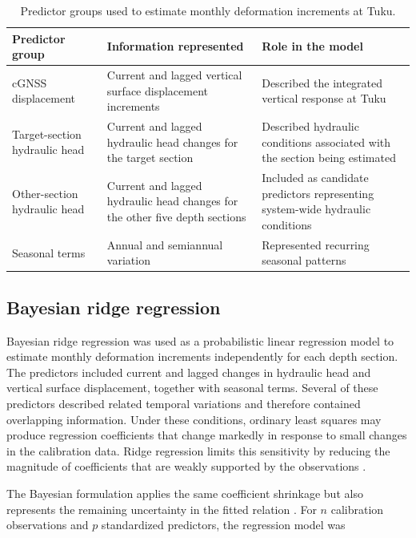 \begin{table}[htbp]
  \centering
  \small
  \renewcommand{\arraystretch}{1.15}
  \caption{Predictor groups used to estimate monthly deformation increments at Tuku.}
  \label{tab:predictor_summary}
  \begin{tabularx}{\textwidth}{@{}p{}p{}X@{}}
    \toprule
    \textbf{Predictor group} & \textbf{Information represented} & \textbf{Role in the model} \\
    \midrule
    cGNSS displacement & Current and lagged vertical surface displacement increments & Described the integrated vertical response at Tuku \\
    Target-section hydraulic head & Current and lagged hydraulic head changes for the target section & Described hydraulic conditions associated with the section being estimated \\
    Other-section hydraulic head & Current and lagged hydraulic head changes for the other five depth sections & Included as candidate predictors representing system-wide hydraulic conditions \\
    Seasonal terms & Annual and semiannual variation & Represented recurring seasonal patterns \\
    \bottomrule
  \end{tabularx}
\end{table}

\subsection{Bayesian ridge regression}
\label{subsec:bayesian_ridge}

Bayesian ridge regression was used as a probabilistic linear regression model to estimate monthly deformation increments independently for each depth section. The predictors included current and lagged changes in hydraulic head and vertical surface displacement, together with seasonal terms. Several of these predictors described related temporal variations and therefore contained overlapping information. Under these conditions, ordinary least squares may produce regression coefficients that change markedly in response to small changes in the calibration data. Ridge regression limits this sensitivity by reducing the magnitude of coefficients that are weakly supported by the observations \citep{hoerl_1970_ridge}.

The Bayesian formulation applies the same coefficient shrinkage but also represents the remaining uncertainty in the fitted relation \citep{mackay_bayesian_1992}. For $n$ calibration observations and $p$ standardized predictors, the regression model was

